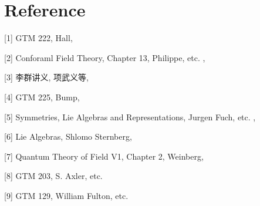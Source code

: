 \documentclass[9pt]{extarticle}
\begin{document}
\clearpage

\section*{Reference}

[1] GTM 222, Hall,

[2] Conforaml Field Theory, Chapter 13, Philippe, etc. ,

[3] 李群讲义, 项武义等, 

[4] GTM 225, Bump,

[5] Symmetries, Lie Algebras and Representations, Jurgen Fuch, etc. ,

[6] Lie Algebras, Shlomo Sternberg,

[7] Quantum Theory of Field V1, Chapter 2, Weinberg,

[8] GTM 203, S. Axler, etc.

[9] GTM 129, William Fulton, etc.
\end{document}
